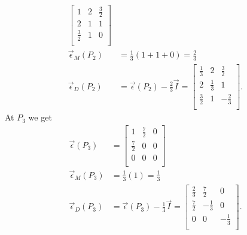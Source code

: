 \begin{derivation}
\begin{align*}
\begin{bmatrix}
        1 & 2 & \frac{3}{2}\\
      2 & 1 & 1\\
      \frac{3}{2} & 1 & 0\\
      \end{bmatrix} \\
      \Vec{\epsilon}_M(P_2) &= \frac{1}{3}(1+1+0) = \frac{2}{3}\\
      \Vec{\epsilon}_D (P_2) &= \Vec{\epsilon}(P_2) - \frac{2}{3}\Vec{I} = \begin{bmatrix}
        \frac{1}{3} & 2 & \frac{3}{2}\\
      2 & \frac{1}{3} & 1\\
      \frac{3}{2} & 1 & -\frac{2}{3}\\
      \end{bmatrix} 
    .\end{align*}
    At $P_3$ we get
    \begin{align*}
      \Vec{\epsilon}(P_3) &= \begin{bmatrix}
        1 & \frac{7}{2} & 0\\
      \frac{7}{2} & 0 & 0\\
      0 & 0 & 0\\
      \end{bmatrix} \\
        \Vec{\epsilon}_M(P_3) &= \frac{1}{3} (1) = \frac{1}{3} \\
        \Vec{\epsilon}_D(P_3) &= \Vec{\epsilon}(P_3) - \frac{1}{3}\Vec{I} = \begin{bmatrix}
          \frac{2}{3} & \frac{7}{2} & 0\\
        \frac{7}{2} & - \frac{1}{3} & 0\\
        0 & 0 & - \frac{1}{3}\\
        \end{bmatrix}
    .\end{align*}
  \end{derivation}

